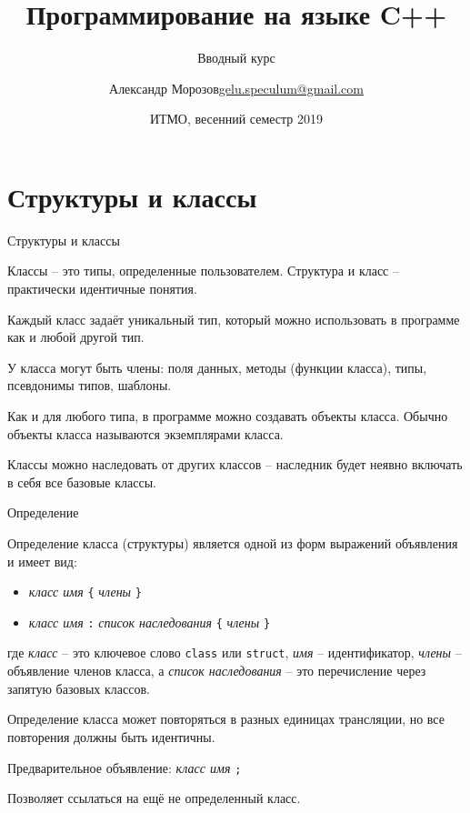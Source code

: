 \documentclass[unknownkeysallowed,xcolor=table]{beamer}
\title[C++]
{Программирование на языке C++}
\subtitle{Вводный курс}
\author[А.~Б.~Морозов]
{
  \texorpdfstring{Александр Морозов\newline\href{mailto:gelu.speculum@gmail.com}{gelu.speculum@gmail.com}}
  {Александр Морозов}
}
\date[ITMO 2019]
{ИТМО, весенний семестр 2019}
\begin{document}
\frame{\titlepage}


\section{Структуры и классы}

\begin{frame}{Структуры и классы}

Классы -- это типы, определенные пользователем. Структура и класс -- практически идентичные понятия.

\vspace{1em}

Каждый класс задаёт уникальный тип, который можно использовать в программе как и любой другой тип.

\vspace{1em}

У класса могут быть члены: поля данных, методы (функции класса), типы, псевдонимы типов, шаблоны.

\vspace{1em}

Как и для любого типа, в программе можно создавать объекты класса. Обычно объекты класса называются экземплярами класса.

\vspace{1em}

 Классы можно наследовать от других классов -- наследник будет неявно включать в себя все базовые классы.

\end{frame}

\begin{frame}[fragile]{Определение}

Определение класса (структуры) является одной из форм выражений объявления и имеет вид:

\begin{itemize}
  \item \emph{класс имя} \lstinline|{| \emph{члены} \lstinline|}|
  \item \emph{класс имя} \lstinline{:} \emph{список наследования} \lstinline|{| \emph{члены} \lstinline|}|
\end{itemize}

\vspace{0.5em}

где \emph{класс} -- это ключевое слово \lstinline{class} или \lstinline{struct}, \emph{имя} -- идентификатор, \emph{члены} -- объявление членов класса, а \emph{список наследования} -- это перечисление через запятую базовых классов.

\vspace{0.5em}

Определение класса может повторяться в разных единицах трансляции, но все повторения должны быть идентичны.

\vspace{0.5em}

Предварительное объявление: \emph{класс имя} \lstinline{;}

Позволяет ссылаться на ещё не определенный класс.

\end{frame}
\end{document}
